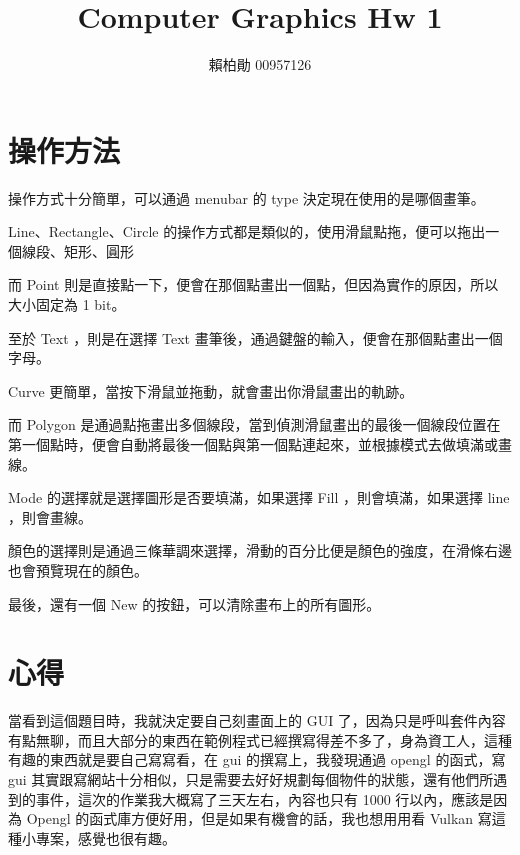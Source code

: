 \documentclass[a4,12pt]{article}
\title{Computer Graphics Hw 1}
\author{賴柏勛 00957126}
\begin{document}
    \maketitle
    \section{操作方法}
    

    操作方式十分簡單，可以通過 menubar 的 type 決定現在使用的是哪個畫筆。
    
    Line、Rectangle、Circle 的操作方式都是類似的，使用滑鼠點拖，便可以拖出一個線段、矩形、圓形

    而 Point 則是直接點一下，便會在那個點畫出一個點，但因為實作的原因，所以大小固定為 1 bit。

    至於 Text ，則是在選擇 Text 畫筆後，通過鍵盤的輸入，便會在那個點畫出一個字母。

    Curve 更簡單，當按下滑鼠並拖動，就會畫出你滑鼠畫出的軌跡。

    而 Polygon 是通過點拖畫出多個線段，當到偵測滑鼠畫出的最後一個線段位置在第一個點時，便會自動將最後一個點與第一個點連起來，並根據模式去做填滿或畫線。

    Mode 的選擇就是選擇圖形是否要填滿，如果選擇 Fill ，則會填滿，如果選擇 line ，則會畫線。

    顏色的選擇則是通過三條華調來選擇，滑動的百分比便是顏色的強度，在滑條右邊也會預覽現在的顏色。

    最後，還有一個 New 的按鈕，可以清除畫布上的所有圖形。
    \section{心得}
    當看到這個題目時，我就決定要自己刻畫面上的 GUI 了，因為只是呼叫套件內容有點無聊，而且大部分的東西在範例程式已經撰寫得差不多了，身為資工人，這種有趣的東西就是要自己寫寫看，在 gui 的撰寫上，我發現通過 opengl 的函式，寫 gui 其實跟寫網站十分相似，只是需要去好好規劃每個物件的狀態，還有他們所遇到的事件，這次的作業我大概寫了三天左右，內容也只有 1000 行以內，應該是因為 Opengl 的函式庫方便好用，但是如果有機會的話，我也想用用看 Vulkan 寫這種小專案，感覺也很有趣。
    
\end{document}
